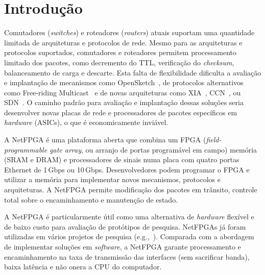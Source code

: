 \newpage
\section{Introdução}

Comutadores (\emph{switches}) e roteadores (\emph{routers}) atuais
suportam uma quantidade limitada de arquiteturas e protocolos de rede.
Mesmo para as arquiteturas e protocolos suportados, comutadores e
roteadores permitem processamento limitado dos pacotes, como decremento
do TTL, verificação do \emph{checksum}, balanceamento de carga e
descarte.  Esta falta de flexibilidade dificulta a avaliação e
implantação de mecanismos como OpenSketch~\cite{yu13opensketch}, de
protocolos alternativos como Free-riding
Multicast~\cite{ratnasamy06multicast} e de novas arquiteturas como
XIA~\cite{han12xia}, CCN~\cite{jacobson09content}, ou
SDN~\cite{casado09ethane}.  O caminho padrão para avaliação e
implantação dessas soluções seria desenvolver novas placas de rede e
processadores de pacotes específicos em \emph{hardware} (ASICs), o que é
economicamente inviável.

A NetFPGA é uma plataforma aberta que combina um FPGA
(\emph{field-programmable gate array}, ou arranjo de portas programável
em campo) memória (SRAM e DRAM) e processadores de sinais numa placa com
quatro portas Ethernet de 1\,Gbps ou 10\,Gbps.  Desenvolvedores podem
programar o FPGA e utilizar a memória para implementar novos mecanismos,
protocolos e arquiteturas.  A NetFPGA permite modificação dos pacotes em
trânsito, controle total sobre o encaminhamento e manutenção de estado.

A NetFPGA é particularmente útil como uma alternativa de \emph{hardware}
flexível e de baixo custo para avaliação de protótipos de pesquisa.
NetFPGAs já foram utilizadas em vários projetos de pesquisa
(e.g.,~\cite{yu13opensketch, Naous:2008:IOS:1477942.1477944,
ghani10secure, thinh12fpga, antichi12open, lombardo12netfpga}).
Comparada com a abordagem de implementar soluções em \emph{software}, a
NetFPGA garante processamento e encaminhamento na taxa de transmissão
das interfaces (sem sacrificar banda), baixa latência e não onera a CPU
do computador.


